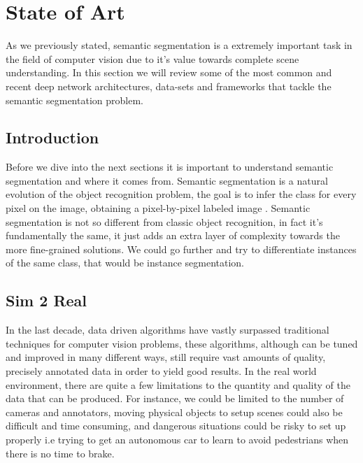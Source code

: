 
\chapter{State of Art}
\label{marcoteorico}
As we previously stated, semantic segmentation is a extremely important task in the field of computer vision due to it's value towards complete scene understanding.
In this section we will review some of the most common and recent deep network architectures, data-sets and frameworks that tackle the semantic segmentation problem.

\section{Introduction}
Before we dive into the next sections it is important to understand semantic segmentation and where it comes from. Semantic segmentation is a natural evolution of the object recognition problem, the goal is to infer the class for every pixel on the image, obtaining a pixel-by-pixel labeled image
. 
Semantic segmentation is not so different from classic object recognition, in fact it's fundamentally the same, it just adds an extra layer of complexity towards the more fine-grained solutions. We could go further and try to differentiate instances of the same class, that would be instance segmentation. 

\section{Sim 2 Real}
In the last decade, data driven algorithms have vastly surpassed traditional techniques for computer vision problems, these algorithms, although can be tuned and improved in many different ways, still require vast amounts of quality, precisely annotated data in order to yield good results. In the real world environment, there are quite a few limitations to the quantity and quality of the data that can be produced. For instance, we could be limited to the number of cameras and annotators, moving physical objects to setup scenes could also be difficult and time consuming, and dangerous situations could be risky to set up properly i.e trying to get an autonomous car to learn to avoid pedestrians when there is no time to brake.
    
